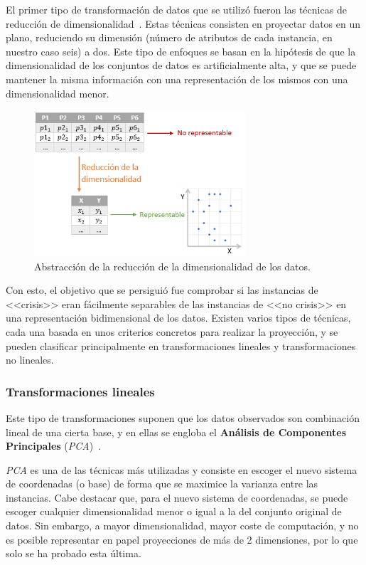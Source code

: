 El primer tipo de transformación de datos que se utilizó fueron las técnicas de reducción de dimensionalidad~\cite{fodor2002dimreduction}. Estas técnicas consisten en proyectar datos en un plano, reduciendo su dimensión (número de atributos de cada instancia, en nuestro caso seis) a dos. Este tipo de enfoques se basan en la hipótesis de que la dimensionalidad de los conjuntos de datos es artificialmente alta, y que se puede mantener la misma información con una representación de los mismos con una dimensionalidad menor. 

\begin{figure}[H]
	\centering
	\includegraphics[width=0.7\textwidth]{../img/reducdim.png}
	\caption{Abstracción de la reducción de la dimensionalidad de los datos.}
	\label{fig:reducdim}
\end{figure}


Con esto, el objetivo que se persiguió fue comprobar si las instancias de <<crisis>> eran fácilmente separables de las instancias de <<no crisis>> en una representación bidimensional de los datos. Existen varios tipos de técnicas, cada una basada en unos criterios concretos para realizar la proyección, y se pueden clasificar principalmente en transformaciones lineales y transformaciones no lineales.  

\subsubsection{Transformaciones lineales}

Este tipo de transformaciones suponen que los datos observados son combinación lineal de una cierta base, y en ellas se engloba el \textbf{Análisis de Componentes Principales} (\textit{PCA})~\cite{pca}. 

\textit{PCA} es una de las técnicas más utilizadas y consiste en escoger el nuevo sistema de coordenadas (o base) de forma que se maximice la varianza entre las instancias. Cabe destacar que, para el nuevo sistema de coordenadas, se puede escoger cualquier dimensionalidad menor o igual a la del conjunto original de datos. Sin embargo, a mayor dimensionalidad, mayor coste de computación, y no es posible representar en papel proyecciones de más de 2 dimensiones, por lo que solo se ha probado esta última. 

